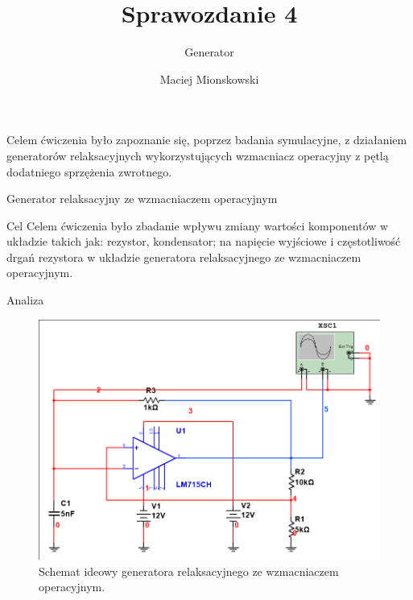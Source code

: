 \documentclass[a4paper]{scrartcl}
\author{Maciej Mionskowski}
\title{Sprawozdanie 4}
\date{}
\subtitle{Generator}
\begin{document}
	{\let\newpage\relax\maketitle}
	{\begin{center}Celem ćwiczenia było zapoznanie się, poprzez badania symulacyjne, z działaniem generatorów relaksacyjnych wykorzystujących wzmacniacz operacyjny z pętlą dodatniego sprzężenia zwrotnego.\end{center}}
	\begin{section}{Generator relaksacyjny ze wzmacniaczem operacyjnym}
		\begin{subsection}{Cel}
			Celem ćwiczenia było zbadanie wpływu zmiany wartości komponentów w układzie takich jak: rezystor, kondensator; na napięcie wyjściowe i częstotliwość drgań rezystora w układzie generatora relaksacyjnego ze wzmacniaczem operacyjnym.
		\end{subsection}
		\begin{subsection}{Analiza}
				\begin{figure}[ht]
				\begin{center}
					\includegraphics[width=0.8\linewidth]{03-circuit}
					\caption{Schemat ideowy generatora relaksacyjnego ze wzmacniaczem operacyjnym.}
					\label{fig:circuit-1}
				\end{center}
				\end{figure}


\end{subsection}
\end{section}
\end{document}

